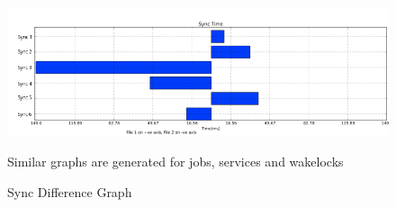 \begin{figure}[t!]
 	\begin{center}
		\includegraphics[scale=0.5]{diff2}
		\caption{Sync Difference Graph}
		Similar graphs are generated for jobs, services and wakelocks
	\end{center}
\end{figure}
